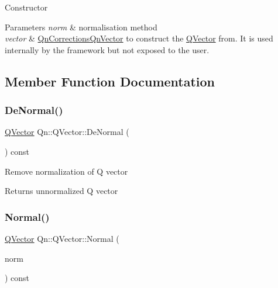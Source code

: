 Constructor 
\begin{DoxyParams}{Parameters}
{\em norm} & normalisation method \\
\hline
{\em vector} & \mbox{\hyperlink{classQnCorrectionsQnVector}{Qn\+Corrections\+Qn\+Vector}} to construct the \mbox{\hyperlink{classQn_1_1QVector}{Q\+Vector}} from. It is used internally by the framework but not exposed to the user. \\
\hline
\end{DoxyParams}


\subsection{Member Function Documentation}
\mbox{\label{classQn_1_1QVector_a0333c85d2b5bef4bb6ebb05150e6404f}} 
\subsubsection{\texorpdfstring{De\+Normal()}{DeNormal()}}
{\footnotesize\ttfamily \mbox{\hyperlink{classQn_1_1QVector}{Q\+Vector}} Qn\+::\+Q\+Vector\+::\+De\+Normal (\begin{DoxyParamCaption}{ }\end{DoxyParamCaption}) const}

Remove normalization of Q vector \begin{DoxyReturn}{Returns}
unnormalized Q vector 
\end{DoxyReturn}
\mbox{\label{classQn_1_1QVector_a97c368ca124a2b52af3b9680b8909d4b}} 
\subsubsection{\texorpdfstring{Normal()}{Normal()}}
{\footnotesize\ttfamily \mbox{\hyperlink{classQn_1_1QVector}{Q\+Vector}} Qn\+::\+Q\+Vector\+::\+Normal (\begin{DoxyParamCaption}\item[{const \mbox{\hyperlink{classQn_1_1CorrectionQnVector_a2998fe4babb716c57848c8c73b24a398}{Q\+Vector\+::\+Normalization}}}]{norm }\end{DoxyParamCaption}) const}

